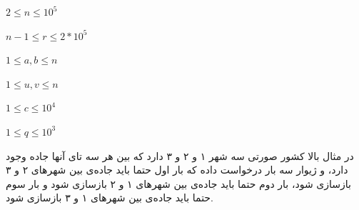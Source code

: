 \documentclass[11.5pt,a4paper,oneside]{article}
\begin{document}
\begin{problem}
\constraints
\begin{shortitems}
\item $2 \le n \le 10^5$
\item $n-1 \le r \le 2*10^5$
\item $1 \le a, b \le n$
\item $1 \le u, v \le n$
\item $1 \le c \le 10^4$
\item $1 \le q \le 10^3$
\end{shortitems}

\sampleIO

\begin{example}
%
\end{example}

\sampleIODescription
در مثال بالا کشور صورتی سه شهر ۱ و ۲ و ۳ دارد که بین هر سه تای آنها جاده وجود دارد،‌ و ژیوار سه بار درخواست داده که بار اول حتما باید جاده‌ی بین شهر‌های ۲ و ۳ باز‌سازی شود، بار دوم حتما باید جاده‌ی بین شهر‌های ۱ و ۲ بازسازی شود و بار سوم حتما باید جاده‌ی بین شهر‌های ۱ و ۳ بازسازی شود.
\end{problem}
\end{document}
